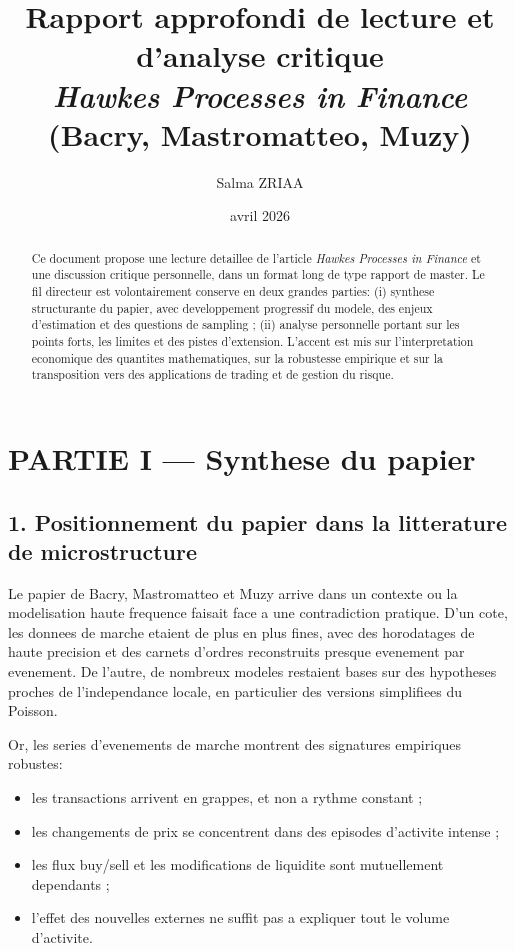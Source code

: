 \documentclass[11pt,a4paper]{article}
\title{Rapport approfondi de lecture et d'analyse critique\\
\large \emph{Hawkes Processes in Finance} (Bacry, Mastromatteo, Muzy)}
\author{Salma ZRIAA}
\date{avril 2026}
\begin{document}
\maketitle

\begin{abstract}
Ce document propose une lecture detaillee de l'article \emph{Hawkes Processes in Finance} et une discussion critique personnelle, dans un format long de type rapport de master. Le fil directeur est volontairement conserve en deux grandes parties: (i) synthese structurante du papier, avec developpement progressif du modele, des enjeux d'estimation et des questions de sampling ; (ii) analyse personnelle portant sur les points forts, les limites et des pistes d'extension. L'accent est mis sur l'interpretation economique des quantites mathematiques, sur la robustesse empirique et sur la transposition vers des applications de trading et de gestion du risque.
\end{abstract}

\tableofcontents
\newpage

\section*{PARTIE I --- Synthese du papier}

\subsection*{1. Positionnement du papier dans la litterature de microstructure}

Le papier de Bacry, Mastromatteo et Muzy arrive dans un contexte ou la modelisation haute frequence faisait face a une contradiction pratique. D'un cote, les donnees de marche etaient de plus en plus fines, avec des horodatages de haute precision et des carnets d'ordres reconstruits presque evenement par evenement. De l'autre, de nombreux modeles restaient bases sur des hypotheses proches de l'independance locale, en particulier des versions simplifiees du Poisson.

Or, les series d'evenements de marche montrent des signatures empiriques robustes:
\begin{itemize}[leftmargin=1.2cm]
    \item les transactions arrivent en grappes, et non a rythme constant ;
    \item les changements de prix se concentrent dans des episodes d'activite intense ;
    \item les flux buy/sell et les modifications de liquidite sont mutuellement dependants ;
    \item l'effet des nouvelles externes ne suffit pas a expliquer tout le volume d'activite.
\end{itemize}
\end{document}
